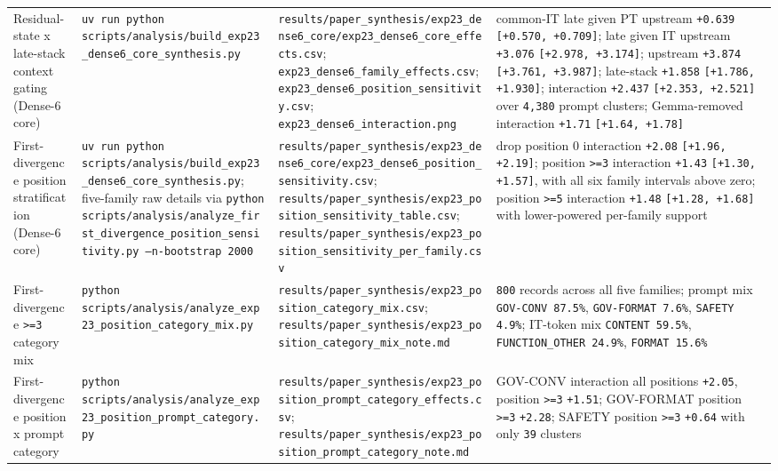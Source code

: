 \documentclass[11pt]{article}
\begin{document}
\begin{table}[t]
\begin{tabularx}{\linewidth}{@{}>{\raggedright\arraybackslash}X >{\raggedright\arraybackslash}X >{\raggedright\arraybackslash}X >{\raggedright\arraybackslash}X@{}}
Residual-state x late-stack context gating (Dense-6 core) & \texttt{uv run python scripts/analysis/build\_exp23\_dense6\_core\_synthesis.py} & \texttt{results/paper\_synthesis/exp23\_dense6\_core/exp23\_dense6\_core\_effects.csv}; \texttt{exp23\_dense6\_family\_effects.csv}; \texttt{exp23\_dense6\_position\_sensitivity.csv}; \texttt{exp23\_dense6\_interaction.png} & common-IT late given PT upstream \texttt{+0.639} \texttt{[+0.570, +0.709]}; late given IT upstream \texttt{+3.076} \texttt{[+2.978, +3.174]}; upstream \texttt{+3.874} \texttt{[+3.761, +3.987]}; late-stack \texttt{+1.858} \texttt{[+1.786, +1.930]}; interaction \texttt{+2.437} \texttt{[+2.353, +2.521]} over \texttt{4,380} prompt clusters; Gemma-removed interaction \texttt{+1.71} \texttt{[+1.64, +1.78]} \\
First-divergence position stratification (Dense-6 core) & \texttt{uv run python scripts/analysis/build\_exp23\_dense6\_core\_synthesis.py}; five-family raw details via \texttt{python scripts/analysis/analyze\_first\_divergence\_position\_sensitivity.py --n-bootstrap 2000} & \texttt{results/paper\_synthesis/exp23\_dense6\_core/exp23\_dense6\_position\_sensitivity.csv}; \texttt{results/paper\_synthesis/exp23\_position\_sensitivity\_table.csv}; \texttt{results/paper\_synthesis/exp23\_position\_sensitivity\_per\_family.csv} & drop position 0 interaction \texttt{+2.08} \texttt{[+1.96, +2.19]}; position \texttt{>=3} interaction \texttt{+1.43} \texttt{[+1.30, +1.57]}, with all six family intervals above zero; position \texttt{>=5} interaction \texttt{+1.48} \texttt{[+1.28, +1.68]} with lower-powered per-family support \\
First-divergence \texttt{>=3} category mix & \texttt{python scripts/analysis/analyze\_exp23\_position\_category\_mix.py} & \texttt{results/paper\_synthesis/exp23\_position\_category\_mix.csv}; \texttt{results/paper\_synthesis/exp23\_position\_category\_mix\_note.md} & \texttt{800} records across all five families; prompt mix \texttt{GOV-CONV 87.5\%}, \texttt{GOV-FORMAT 7.6\%}, \texttt{SAFETY 4.9\%}; IT-token mix \texttt{CONTENT 59.5\%}, \texttt{FUNCTION\_OTHER 24.9\%}, \texttt{FORMAT 15.6\%} \\
First-divergence position x prompt category & \texttt{python scripts/analysis/analyze\_exp23\_position\_prompt\_category.py} & \texttt{results/paper\_synthesis/exp23\_position\_prompt\_category\_effects.csv}; \texttt{results/paper\_synthesis/exp23\_position\_prompt\_category\_note.md} & GOV-CONV interaction all positions \texttt{+2.05}, position \texttt{>=3} \texttt{+1.51}; GOV-FORMAT position \texttt{>=3} \texttt{+2.28}; SAFETY position \texttt{>=3} \texttt{+0.64} with only \texttt{39} clusters \\

\end{tabularx}
\end{table}
\end{document}
